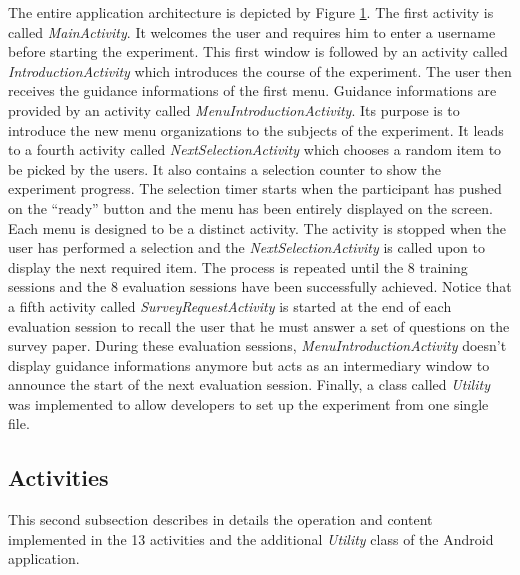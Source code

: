 The entire application architecture is depicted by Figure 
\ref{fig:architecture}. The first activity is called \textit{MainActivity}. It 
welcomes the user and requires him to enter a username before starting the 
experiment. This first window is followed by an activity called 
\textit{IntroductionActivity} which introduces the course of the experiment. 
The 
user then receives the guidance informations of the first menu. Guidance 
informations are provided by an activity called 
\textit{MenuIntroductionActivity}. Its purpose is to introduce 
the new menu organizations to the subjects of the experiment. It leads to a 
fourth activity called \textit{NextSelectionActivity} which chooses a random 
item to be picked by the users. It also contains a selection counter to show 
the experiment progress. The selection timer starts when the participant has 
pushed on the \enquote{ready} button and the menu has been entirely displayed on 
the screen. Each menu is designed to be a distinct activity. The activity is 
stopped when the user has performed a selection and the 
\textit{NextSelectionActivity} is called upon to display the next required item. 
The process is repeated until the 8 training sessions and the 8 evaluation 
sessions have been successfully achieved. Notice that a fifth activity called 
\textit{SurveyRequestActivity} is started at the end of each evaluation session 
to recall the user that he must answer a set of questions on the survey paper. 
During these evaluation sessions, \textit{MenuIntroductionActivity} doesn't 
display guidance informations anymore but acts as an intermediary window to 
announce the start of the next evaluation session. Finally, a class called 
\textit{Utility} was implemented to allow developers to set up the experiment 
from one single file.\newline

\begin{figure}[!ht]
    
    \label{fig:architecture}
\end{figure}

\subsection{Activities}

This second subsection describes in details the operation and content 
implemented in the 13 activities and the additional \textit{Utility} class of 
the Android application.

